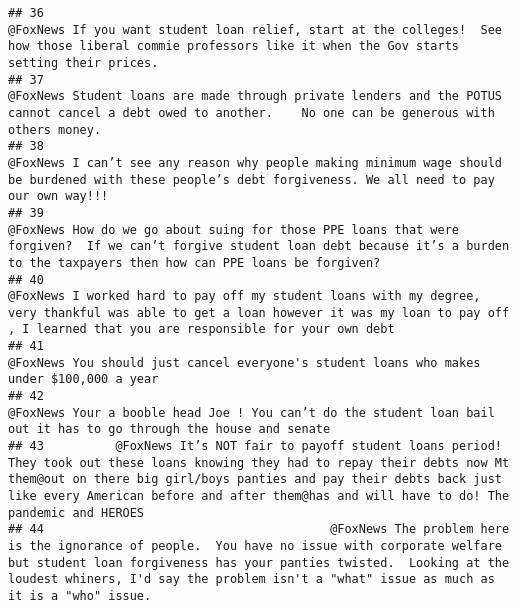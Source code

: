 \documentclass[
]{article}
\begin{document}
\begin{verbatim}
## 36                                                                                                                                             @FoxNews If you want student loan relief, start at the colleges!  See how those liberal commie professors like it when the Gov starts setting their prices.
## 37                                                                                                                                                @FoxNews Student loans are made through private lenders and the POTUS cannot cancel a debt owed to another.    No one can be generous with others money.
## 38                                                                                                                                               @FoxNews I can’t see any reason why people making minimum wage should be burdened with these people’s debt forgiveness. We all need to pay our own way!!!
## 39                                                                                                             @FoxNews How do we go about suing for those PPE loans that were forgiven?  If we can’t forgive student loan debt because it’s a burden to the taxpayers then how can PPE loans be forgiven?
## 40                                                                                                        @FoxNews I worked hard to pay off my student loans with my degree, very thankful was able to get a loan however it was my loan to pay off , I learned that you are responsible for your own debt
## 41                                                                                                                                                                                                                @FoxNews You should just cancel everyone's student loans who makes under $100,000 a year
## 42                                                                                                                                                                                      @FoxNews Your a booble head Joe ! You can’t do the student loan bail out it has to go through the house and senate
## 43          @FoxNews It’s NOT fair to payoff student loans period! They took out these loans knowing they had to repay their debts now Mt them@out on there big girl/boys panties and pay their debts back just like every American before and after them@has and will have to do! The pandemic and HEROES
## 44                                        @FoxNews The problem here is the ignorance of people.  You have no issue with corporate welfare but student loan forgiveness has your panties twisted.  Looking at the loudest whiners, I'd say the problem isn't a "what" issue as much as it is a "who" issue.

\end{verbatim}
\end{document}
